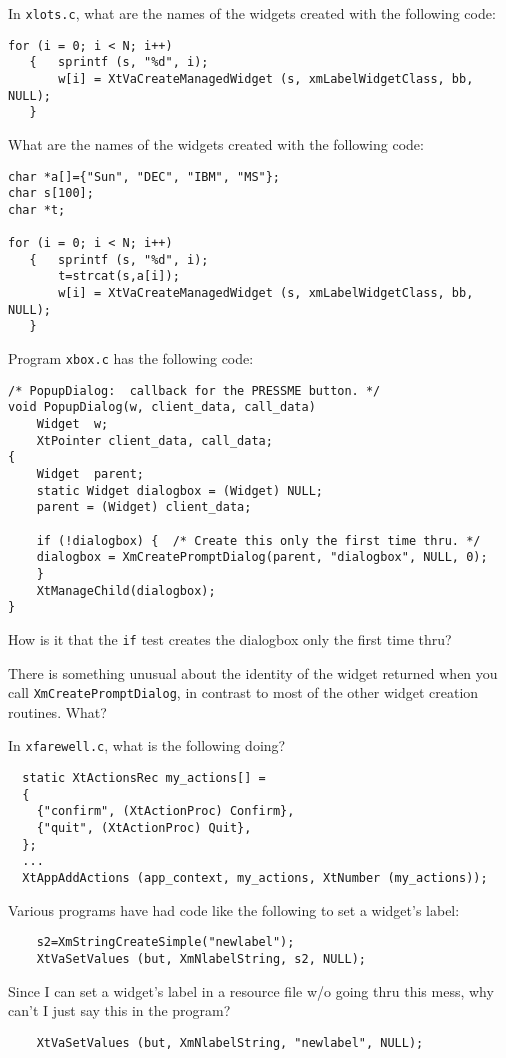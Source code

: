 \documentclass[twoside]{article}
\begin{document}
\begin{enumerate}
 In \texttt{xlots.c}, what are the names of the widgets
created with the following code:
\begin{verbatim}
for (i = 0; i < N; i++)
   {   sprintf (s, "%d", i);
       w[i] = XtVaCreateManagedWidget (s, xmLabelWidgetClass, bb, NULL);
   }
\end{verbatim}

 What are the names of the widgets
created with the following code:
\begin{verbatim}
char *a[]={"Sun", "DEC", "IBM", "MS"};
char s[100];
char *t;

for (i = 0; i < N; i++)
   {   sprintf (s, "%d", i);
       t=strcat(s,a[i]);
       w[i] = XtVaCreateManagedWidget (s, xmLabelWidgetClass, bb, NULL);
   }
\end{verbatim}


 Program \texttt{xbox.c} has the following code:

\begin{verbatim}
/* PopupDialog:  callback for the PRESSME button. */
void PopupDialog(w, client_data, call_data)
    Widget  w;
    XtPointer client_data, call_data;
{
    Widget  parent;
    static Widget dialogbox = (Widget) NULL;
    parent = (Widget) client_data;

    if (!dialogbox) {  /* Create this only the first time thru. */
	dialogbox = XmCreatePromptDialog(parent, "dialogbox", NULL, 0);	
    }
    XtManageChild(dialogbox);
}
\end{verbatim}
How is it that the \texttt{if} test creates the dialogbox only the
first time thru?



 There is something unusual about the identity of the
widget returned when you call \texttt{XmCreatePromptDialog}, in
contrast to most of the other widget creation routines.  What? 



 In \texttt{xfarewell.c}, what is the following doing?
\begin{verbatim}
  static XtActionsRec my_actions[] =
  {
    {"confirm", (XtActionProc) Confirm},
    {"quit", (XtActionProc) Quit},
  };
  ...
  XtAppAddActions (app_context, my_actions, XtNumber (my_actions));
\end{verbatim}


 Various programs have had code like the following to set a
widget's label:
\begin{verbatim}
    s2=XmStringCreateSimple("newlabel");
    XtVaSetValues (but, XmNlabelString, s2, NULL);
\end{verbatim}
Since I can set a widget's label in a resource file w/o going thru
this mess, 
why can't I just say this in the program?
\begin{verbatim}
    XtVaSetValues (but, XmNlabelString, "newlabel", NULL);
\end{verbatim}



\end{enumerate}
\end{document}
